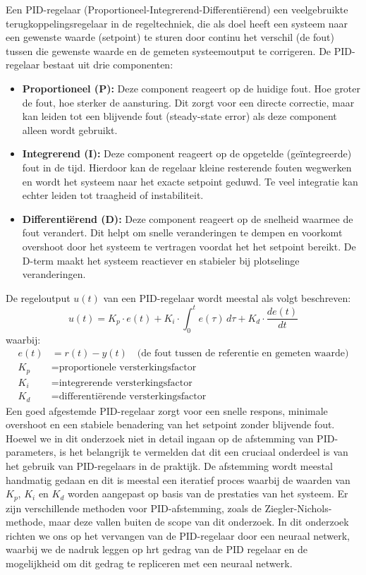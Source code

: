 Een PID-regelaar (Proportioneel-Integrerend-Differentiërend)\cite{WikipediaPID2025} een veelgebruikte terugkoppelingsregelaar in de regeltechniek, die als doel heeft een systeem naar een gewenste waarde (setpoint) te sturen door continu het verschil (de fout) tussen die gewenste waarde en de gemeten systeemoutput te corrigeren.
De PID-regelaar bestaat uit drie componenten:
\begin{itemize}
  \item \textbf{Proportioneel (P):} Deze component reageert op de huidige fout. Hoe groter de fout, hoe sterker de aansturing. Dit zorgt voor een directe correctie, maar kan leiden tot een blijvende fout (steady-state error) als deze component alleen wordt gebruikt.
  \item \textbf{Integrerend (I):} Deze component reageert op de opgetelde (geïntegreerde) fout in de tijd. Hierdoor kan de regelaar kleine resterende fouten wegwerken en wordt het systeem naar het exacte setpoint geduwd. Te veel integratie kan echter leiden tot traagheid of instabiliteit.
  \item \textbf{Differentiërend (D):} Deze component reageert op de snelheid waarmee de fout verandert. Dit helpt om snelle veranderingen te dempen en voorkomt overshoot door het systeem te vertragen voordat het het setpoint bereikt. De D-term maakt het systeem reactiever en stabieler bij plotselinge veranderingen.
\end{itemize}
De regeloutput \( u(t) \) van een PID-regelaar wordt meestal als volgt beschreven:
\begin{equation}
u(t) = K_p \cdot e(t) + K_i \cdot \int_0^t e(\tau)\,d\tau + K_d \cdot \frac{de(t)}{dt}
\label{eq:pid}
\end{equation}
waarbij:
\[
\begin{aligned}
e(t) &= r(t) - y(t) \quad \text{(de fout tussen de referentie en gemeten waarde)} \\
K_p  &= \text{proportionele versterkingsfactor} \\
K_i  &= \text{integrerende versterkingsfactor} \\
K_d  &= \text{differentiërende versterkingsfactor}
\end{aligned}
\]
Een goed afgestemde PID-regelaar zorgt voor een snelle respons, minimale overshoot en een stabiele benadering van het setpoint zonder blijvende fout. Hoewel we in dit onderzoek niet in detail ingaan op de afstemming van PID-parameters, is het belangrijk te vermelden dat dit een cruciaal onderdeel is van het gebruik van PID-regelaars in de praktijk. De afstemming wordt meestal handmatig gedaan en dit is meestal een iteratief proces waarbij de waarden van \(K_p\), \(K_i\) en \(K_d\) worden aangepast op basis van de prestaties van het systeem. Er zijn verschillende methoden voor PID-afstemming, zoals de Ziegler-Nichols-methode, maar deze vallen buiten de scope van dit onderzoek. In dit onderzoek richten we ons op het vervangen van de PID-regelaar door een neuraal netwerk, waarbij we de nadruk leggen op hrt gedrag van de PID regelaar en de mogelijkheid om dit gedrag te repliceren met een neuraal netwerk.
